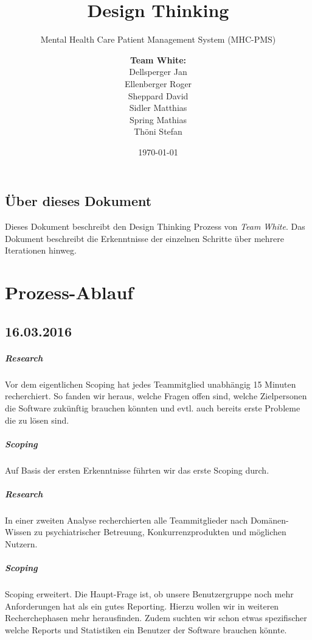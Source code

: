\documentclass[a4paper]{scrreprt}
\title{Design Thinking}
\subtitle{Mental Health Care Patient Management System (MHC-PMS)}
\author{
\begin{tabular}{l}
\normalfont\bfseries{Team White:}\\
Dellsperger Jan\\
Ellenberger Roger\\
Sheppard David\\
Sidler Matthias\\
Spring Mathias\\
Thöni Stefan
\end{tabular}
}
\date{\today}
\begin{document}
\begin{titlepage}
	\maketitle
\end{titlepage}



\section*{Über dieses Dokument}
Dieses Dokument beschreibt den Design Thinking Prozess von \textit{Team White}. Das Dokument beschreibt die Erkenntnisse der einzelnen Schritte über mehrere Iterationen hinweg.


\chapter{Prozess-Ablauf}
\section*{16.03.2016}
\paragraph{Research}
Vor dem eigentlichen Scoping hat jedes Teammitglied unabhängig 15 Minuten recherchiert. So fanden wir heraus, welche Fragen offen sind, welche Zielpersonen die Software zukünftig brauchen könnten und evtl. auch bereits erste Probleme die zu lösen sind.


\paragraph{Scoping}
Auf Basis der ersten Erkenntnisse führten wir das erste Scoping durch.


\paragraph{Research}
In einer zweiten Analyse recherchierten alle Teammitglieder nach Domänen-Wissen zu psychiatrischer Betreuung, Konkurrenzprodukten und möglichen Nutzern.


\paragraph{Scoping}
Scoping erweitert. Die Haupt-Frage ist, ob unsere Benutzergruppe noch mehr Anforderungen hat als ein gutes Reporting. Hierzu wollen wir in weiteren Recherchephasen mehr herausfinden. Zudem suchten wir schon etwas spezifischer welche Reports und Statistiken ein Benutzer der Software brauchen könnte.
\end{document}

